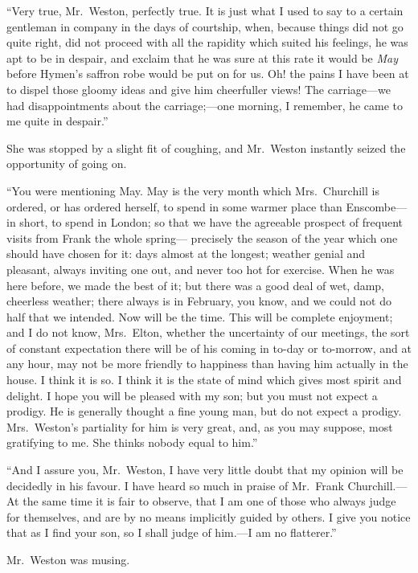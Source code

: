 ``Very true, Mr.\ Weston, perfectly true.  It is just what I used
to say to a certain gentleman in company in the days of courtship,
when, because things did not go quite right, did not proceed with all
the rapidity which suited his feelings, he was apt to be in despair,
and exclaim that he was sure at this rate it would be \emph{May} before
Hymen's saffron robe would be put on for us.  Oh! the pains I have
been at to dispel those gloomy ideas and give him cheerfuller views!
The carriage---we had disappointments about the carriage;---one morning,
I remember, he came to me quite in despair.''

She was stopped by a slight fit of coughing, and Mr.\ Weston instantly
seized the opportunity of going on.

``You were mentioning May.  May is the very month which Mrs.\ Churchill
is ordered, or has ordered herself, to spend in some warmer place
than Enscombe---in short, to spend in London; so that we have the
agreeable prospect of frequent visits from Frank the whole spring---%
precisely the season of the year which one should have chosen
for it:  days almost at the longest; weather genial and pleasant,
always inviting one out, and never too hot for exercise.  When he
was here before, we made the best of it; but there was a good deal
of wet, damp, cheerless weather; there always is in February, you know,
and we could not do half that we intended.  Now will be the time.
This will be complete enjoyment; and I do not know, Mrs.\ Elton,
whether the uncertainty of our meetings, the sort of constant
expectation there will be of his coming in to-day or to-morrow,
and at any hour, may not be more friendly to happiness than having
him actually in the house.  I think it is so.  I think it is the
state of mind which gives most spirit and delight.  I hope you
will be pleased with my son; but you must not expect a prodigy.
He is generally thought a fine young man, but do not expect a prodigy.
Mrs.\ Weston's partiality for him is very great, and, as you may suppose,
most gratifying to me.  She thinks nobody equal to him.''

``And I assure you, Mr.\ Weston, I have very little doubt that my
opinion will be decidedly in his favour.  I have heard so much
in praise of Mr.\ Frank Churchill.---At the same time it is fair
to observe, that I am one of those who always judge for themselves,
and are by no means implicitly guided by others.  I give you notice
that as I find your son, so I shall judge of him.---I am no flatterer.''

Mr.\ Weston was musing.

